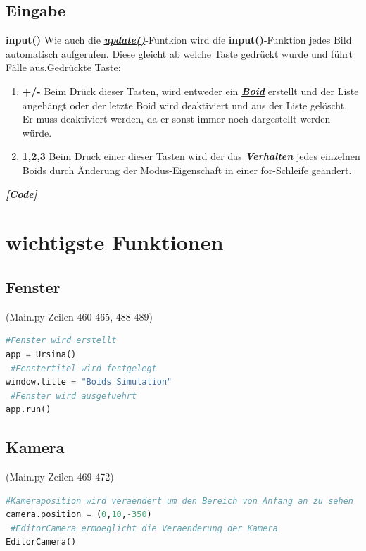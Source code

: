 \documentclass[a4paper, hidelinks, 12pt]{article}
\begin{document}
\subsection{Eingabe}
\textbf{input()}\label{Umsetzunginput}
Wie auch die \hyperref[Umsetzungupdate]{\textbf{\emph{update()}}}-Funtkion\cite{update} wird die \textbf{input()}-Funktion jedes Bild automatisch aufgerufen. Diese gleicht ab welche Taste gedrückt wurde und führt Fälle aus\cite{input}.\newline Gedrückte Taste: 

\begin{enumerate}
\item \textbf{+/-} Beim Drück dieser Tasten, wird entweder ein \hyperref[UmsetzungBoid]{\textbf{\emph{Boid}}} erstellt und der Liste angehängt oder der letzte Boid wird deaktiviert und aus der Liste gelöscht. Er muss deaktiviert werden, da er sonst immer noch dargestellt werden würde.
\item \textbf{1,2,3} Beim Druck einer dieser Tasten wird der das \hyperref[IdeeVerhalten]{\textbf{\emph{Verhalten}}} jedes einzelnen Boids durch Änderung der Modus-Eigenschaft in einer for-Schleife geändert.
	
\end{enumerate}
\hyperref[Codeinput]{\textbf{\emph{[Code]}}}


\newpage
\section{wichtigste Funktionen}
\subsection{Fenster}(Main.py Zeilen 460-465, 488-489)\label{CodeFenster}
\begin{lstlisting}[style=mystyle, language=Python]
 #Fenster wird erstellt
app = Ursina()
 #Fenstertitel wird festgelegt
window.title = "Boids Simulation"
 #Fenster wird ausgefuehrt
app.run()
\end{lstlisting}
\subsection{Kamera}(Main.py Zeilen 469-472)\label{Kamera}
\begin{lstlisting}[style=mystyle, language=Python]
 #Kameraposition wird veraendert um den Bereich von Anfang an zu sehen
camera.position = (0,10,-350)
 #EditorCamera ermoeglicht die Veraenderung der Kamera
EditorCamera()
\end{lstlisting}
\end{document}
